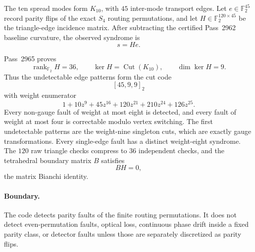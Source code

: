 The ten spread modes form \(K_{10}\), with \(45\) inter-mode transport
edges.  Let \(e\in\mathbb F_2^{45}\) record parity flips of the exact \(S_4\)
routing permutations, and let \(H\in\mathbb F_2^{120\times45}\) be the
triangle-edge incidence matrix.  After subtracting the certified Pass~2962
baseline curvature, the observed syndrome is
\[
 s=He.
\]

Pass~2965 proves
\[
 \operatorname{rank}_{\mathbb F_2}H=36,
 \qquad
 \ker H=\operatorname{Cut}(K_{10}),
 \qquad
 \dim\ker H=9.
\]
Thus the undetectable edge patterns form the cut code
\[
 \boxed{[45,9,9]_2}
\]
with weight enumerator
\[
 1+10z^9+45z^{16}+120z^{21}+210z^{24}+126z^{25}.
\]
Every non-gauge fault of weight at most eight is detected, and every fault of
weight at most four is correctable modulo vertex switching.  The first
undetectable patterns are the weight-nine singleton cuts, which are exactly
gauge transformations.  Every single-edge fault has a distinct weight-eight
syndrome.  The \(120\) raw triangle checks compress to \(36\) independent
checks, and the tetrahedral boundary matrix \(B\) satisfies
\[
 BH=0,
\]
the matrix Bianchi identity.

\paragraph{Boundary.}
The code detects parity faults of the finite routing permutations.  It does not
detect even-permutation faults, optical loss, continuous phase drift inside a
fixed parity class, or detector faults unless those are separately discretized
as parity flips.
